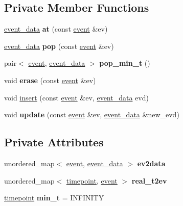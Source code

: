 \subsection*{Private Member Functions}
\begin{DoxyCompactItemize}
\item 
\mbox{\label{classschedule_aa3a27d94f17fe28dcc5c13c367df673a}} 
\hyperlink{structtricl_1_1event__data}{event\+\_\+data} {\bfseries at} (const \hyperlink{structtricl_1_1event}{event} \&ev)
\item 
\mbox{\label{classschedule_a835c0129ec6be3ca954191a26bfb5fee}} 
\hyperlink{structtricl_1_1event__data}{event\+\_\+data} {\bfseries pop} (const \hyperlink{structtricl_1_1event}{event} \&ev)
\item 
\mbox{\label{classschedule_ae618be9f46d8c834617802d067167f05}} 
pair$<$ \hyperlink{structtricl_1_1event}{event}, \hyperlink{structtricl_1_1event__data}{event\+\_\+data} $>$ {\bfseries pop\+\_\+min\+\_\+t} ()
\item 
\mbox{\label{classschedule_a052cfd038a553b18e22c5db9164b3f07}} 
void {\bfseries erase} (const \hyperlink{structtricl_1_1event}{event} \&ev)
\item 
void \hyperlink{classschedule_a8a5b3520d96edd10b0c9c62026487997}{insert} (const \hyperlink{structtricl_1_1event}{event} \&ev, \hyperlink{structtricl_1_1event__data}{event\+\_\+data} evd)
\item 
\mbox{\label{classschedule_abdbc97c36f98a5a6b7c1391204c69b72}} 
void {\bfseries update} (const \hyperlink{structtricl_1_1event}{event} \&ev, \hyperlink{structtricl_1_1event__data}{event\+\_\+data} \&new\+\_\+evd)
\end{DoxyCompactItemize}
\subsection*{Private Attributes}
\begin{DoxyCompactItemize}
\item 
\mbox{\label{classschedule_a4f196e63a4522977fed6d012e1d6734e}} 
unordered\+\_\+map$<$ \hyperlink{structtricl_1_1event}{event}, \hyperlink{structtricl_1_1event__data}{event\+\_\+data} $>$ {\bfseries ev2data}
\item 
\mbox{\label{classschedule_a97915cb3832f457318302af9ce498f84}} 
unordered\+\_\+map$<$ \hyperlink{namespacetricl_a720ff6a29f998e11e1d3622fc8df64b1}{timepoint}, \hyperlink{structtricl_1_1event}{event} $>$ {\bfseries real\+\_\+t2ev}
\item 
\mbox{\label{classschedule_a9a874645cf930ba563997d8962572519}} 
\hyperlink{namespacetricl_a720ff6a29f998e11e1d3622fc8df64b1}{timepoint} {\bfseries min\+\_\+t} = I\+N\+F\+I\+N\+I\+TY
\end{DoxyCompactItemize}


